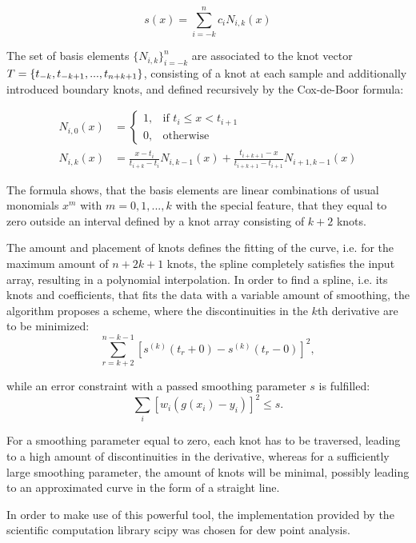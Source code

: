 \begin{equation}
    s(x) = \sum_{i=-k}^{n} c_i  N_{i, k}(x)
\end{equation}

The set of basis elements $\{N_{i,k}\}^n_{i=-k}$ are associated to the knot vector $T = \{t_{-k}, t_{-k+1}, ...,\\t_{n+k+1}\}$, consisting of a knot at each sample and additionally introduced boundary knots, and defined recursively by the Cox-de-Boor formula:

\begin{subequations}
    \begin{align}
        N_{i, 0}(x) &= \begin{cases}
            1,& \text{if } t_i \le x < t_{i+1} \\
            0,& \text{otherwise}
        \end{cases}\\
        N_{i, k}(x) &= \frac{x - t_i}{t_{i+k} - t_i} N_{i, k-1}(x)
        + \frac{t_{i+k+1} - x}{t_{i+k+1} - t_{i+1}} N_{i+1, k-1}(x)
    \end{align}
\end{subequations}

The formula shows, that the basis elements are linear combinations of usual monomials $x^m$  with $m = 0, 1, ..., k$ with the special feature, that they equal to zero outside an interval defined by a knot array consisting of $k + 2$ knots.
    
The amount and placement of knots defines the fitting of the curve, i.e. for the maximum amount of $n + 2k + 1$ knots, the spline completely satisfies the input array, resulting in a polynomial interpolation. In order to find a spline, i.e. its knots and coefficients, that fits the data with a variable amount of smoothing, the algorithm proposes a scheme, where the discontinuities in the $k$th derivative are to be minimized:
\begin{equation}
    \sum_{r=k+2}^{n-k-1} \left[ s^{(k)}(t_r + 0) - s^{(k)}(t_r - 0) \right]^2,
\end{equation}

while an error constraint with a passed smoothing parameter $s$ is fulfilled:
\begin{equation}
    \sum_i \left[ w_i (g(x_i) - y_i)\right]^2 \leqslant s.
\end{equation}

For a smoothing parameter equal to zero, each knot has to be traversed, leading to a high amount of discontinuities in the derivative, whereas for a sufficiently large smoothing parameter, the amount of knots will be minimal, possibly leading to an approximated curve in the form of a straight line.

In order to make use of this powerful tool, the implementation provided by the scientific computation library scipy was chosen for dew point analysis.